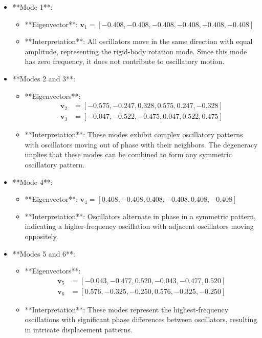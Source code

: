 \documentclass[12pt]{report} %
\begin{document}
\begin{itemize}
    \item **Mode 1**:
    \begin{itemize}
        \item **Eigenvector**: \( \mathbf{v}_1 = [-0.408, -0.408, -0.408, -0.408, -0.408, -0.408] \)
        \item **Interpretation**: All oscillators move in the same direction with equal amplitude, representing the rigid-body rotation mode. Since this mode has zero frequency, it does not contribute to oscillatory motion.
    \end{itemize}
    
    \item **Modes 2 and 3**:
    \begin{itemize}
        \item **Eigenvectors**:
        \[
        \begin{aligned}
        \mathbf{v}_2 &= [-0.575, -0.247,  0.328,  0.575,  0.247, -0.328] \\
        \mathbf{v}_3 &= [-0.047, -0.522, -0.475,  0.047,  0.522,  0.475]
        \end{aligned}
        \]
        \item **Interpretation**: These modes exhibit complex oscillatory patterns with oscillators moving out of phase with their neighbors. The degeneracy implies that these modes can be combined to form any symmetric oscillatory pattern.
    \end{itemize}
    
    \item **Mode 4**:
    \begin{itemize}
        \item **Eigenvector**: \( \mathbf{v}_4 = [ 0.408, -0.408,  0.408, -0.408,  0.408, -0.408] \)
        \item **Interpretation**: Oscillators alternate in phase in a symmetric pattern, indicating a higher-frequency oscillation with adjacent oscillators moving oppositely.
    \end{itemize}
    
    \item **Modes 5 and 6**:
    \begin{itemize}
        \item **Eigenvectors**:
        \[
        \begin{aligned}
        \mathbf{v}_5 &= [-0.043, -0.477,  0.520, -0.043, -0.477,  0.520] \\
        \mathbf{v}_6 &= [ 0.576, -0.325, -0.250,  0.576, -0.325, -0.250]
        \end{aligned}
        \]
        \item **Interpretation**: These modes represent the highest-frequency oscillations with significant phase differences between oscillators, resulting in intricate displacement patterns.
    \end{itemize}
\end{itemize}
\end{document}
